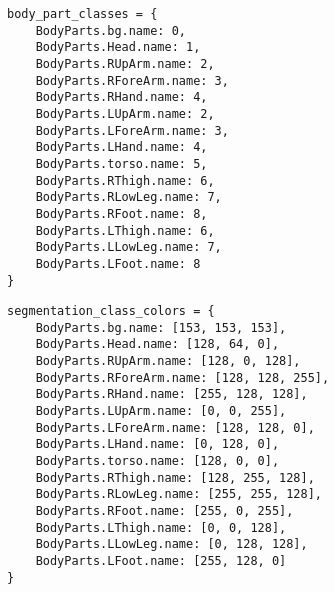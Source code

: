 \begin{figure}

    \fontsmall
\begin{minipage}{0.29\linewidth}
    \begin{Verbatim}[frame=topline,label=Mapping to classes,framesep=1mm]
body_part_classes = {
    BodyParts.bg.name: 0,
    BodyParts.Head.name: 1,
    BodyParts.RUpArm.name: 2,
    BodyParts.RForeArm.name: 3,
    BodyParts.RHand.name: 4,
    BodyParts.LUpArm.name: 2,
    BodyParts.LForeArm.name: 3,
    BodyParts.LHand.name: 4,
    BodyParts.torso.name: 5,
    BodyParts.RThigh.name: 6,
    BodyParts.RLowLeg.name: 7,
    BodyParts.RFoot.name: 8,
    BodyParts.LThigh.name: 6,
    BodyParts.LLowLeg.name: 7,
    BodyParts.LFoot.name: 8
}
    \end{Verbatim}
    \label{fig:test1}
\end{minipage}\hfill
\begin{minipage}{0.49\linewidth}
    \begin{Verbatim}[frame=topline,label=Mapping to RGB values, framesep=1mm]
segmentation_class_colors = {
    BodyParts.bg.name: [153, 153, 153],
    BodyParts.Head.name: [128, 64, 0],
    BodyParts.RUpArm.name: [128, 0, 128],
    BodyParts.RForeArm.name: [128, 128, 255],
    BodyParts.RHand.name: [255, 128, 128],
    BodyParts.LUpArm.name: [0, 0, 255],
    BodyParts.LForeArm.name: [128, 128, 0],
    BodyParts.LHand.name: [0, 128, 0],
    BodyParts.torso.name: [128, 0, 0],
    BodyParts.RThigh.name: [128, 255, 128],
    BodyParts.RLowLeg.name: [255, 255, 128],
    BodyParts.RFoot.name: [255, 0, 255],
    BodyParts.LThigh.name: [0, 0, 128],
    BodyParts.LLowLeg.name: [0, 128, 128],
    BodyParts.LFoot.name: [255, 128, 0]
}
    \end{Verbatim}
     \label{fig:test}
\end{minipage}
    \label{fig:test21}
    \end{figure}


